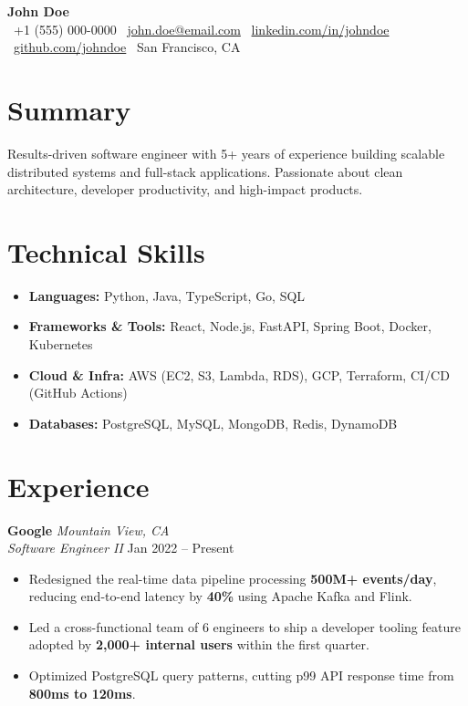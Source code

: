 \documentclass[10pt, letterpaper]{article}
\newcommand{\resumename}[1]{%
  {\Huge\bfseries #1}\\[4pt]
}
\newcommand{\contactinfo}[5]{%
  \small
  \faPhone\ #1 \quad
  \faEnvelope\ \href{mailto:#2}{#2} \quad
  \faLinkedin\ \href{https://linkedin.com/in/#3}{linkedin.com/in/#3} \quad
  \faGithub\ \href{https://github.com/#4}{github.com/#4} \quad
  \faMapMarker*\ #5
  \\[2pt]
}
\newcommand{\jobentry}[4]{%
  \vspace{4pt}
  \textbf{#1} \hfill \textit{#3} \\
  \textit{#2} \hfill \small{#4}
  \vspace{1pt}
}
\begin{document}
\begin{center}
  \resumename{John Doe}
  \contactinfo
    {+1 (555) 000-0000}
    {john.doe@email.com}
    {johndoe}
    {johndoe}
    {San Francisco, CA}
\end{center}

\section{Summary}
Results-driven software engineer with 5+ years of experience building
scalable distributed systems and full-stack applications. Passionate about
clean architecture, developer productivity, and high-impact products.

\section{Technical Skills}
\begin{itemize}[leftmargin=0in, label={}]
  \item \textbf{Languages:} Python, Java, TypeScript, Go, SQL
  \item \textbf{Frameworks \& Tools:} React, Node.js, FastAPI, Spring Boot, Docker, Kubernetes
  \item \textbf{Cloud \& Infra:} AWS (EC2, S3, Lambda, RDS), GCP, Terraform, CI/CD (GitHub Actions)
  \item \textbf{Databases:} PostgreSQL, MySQL, MongoDB, Redis, DynamoDB
\end{itemize}

\section{Experience}

\jobentry{Google}{Software Engineer II}{Mountain View, CA}{Jan 2022 -- Present}
\begin{itemize}
  \item Redesigned the real-time data pipeline processing \textbf{500M+ events/day}, reducing
        end-to-end latency by \textbf{40\%} using Apache Kafka and Flink.
  \item Led a cross-functional team of 6 engineers to ship a developer tooling feature
        adopted by \textbf{2,000+ internal users} within the first quarter.
  \item Optimized PostgreSQL query patterns, cutting p99 API response time from
        \textbf{800ms to 120ms}.
\end{itemize}
\end{document}
